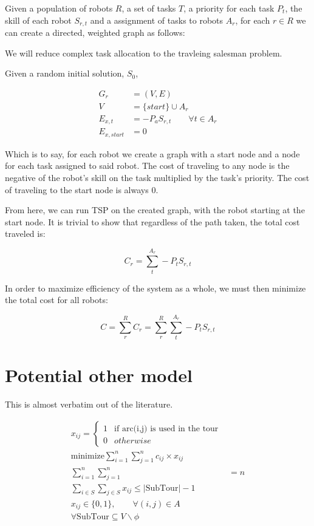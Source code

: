 \documentclass[a4paper]{article}
\begin{document}
Given a population of robots $R$, a set of tasks $T$, a priority for each task $P_t$, the
skill of each robot $S_{r,t}$ and a assignment of tasks to robots $A_r$, for each $r \in R$
we can create a directed, weighted graph as follows:

We will reduce complex task allocation to the travleing salesman problem.

Given a random initial solution, $S_0$,

\begin{align*}
  G_r &= (V, E) \\
  V &= \{ start \} \cup A_r \\
  E_{x, t} &= -P_a S_{r,t} \qquad \forall t \in A_r \\
  E_{x, start} &= 0
\end{align*}

Which is to say, for each robot we create a graph with a start node and a node for each task assigned to said robot. The cost of traveling to any node is the negative of the robot's skill on the task multiplied by the task's priority. The cost of traveling to the start node is always 0.

From here, we can run TSP on the created graph, with the robot starting at the start node. It is trivial to show that regardless of the path taken, the total cost traveled is:

$$C_r = \sum_t^{A_r} -P_t S_{r,t}$$

In order to maximize efficiency of the system as a whole, we must then minimize the total cost for all robots:

$$C = \sum_r^{R} C_r = \sum_r^{R} \sum_t^{A_r} -P_t S_{r,t}$$

\section{Potential other model}

This is almost verbatim out of the literature.

\begin{align}
x_{ij} = \begin{cases}
      1 & \text{if arc(i,j) is used in the tour} \\
      0 & otherwise
   \end{cases} \\
\text{minimize} \sum_{i=1}^n \sum_{j=1}^n c_{ij} \times x_{ij} \\
\sum_{i=1}^n \sum_{j=1}^n &= n \\
\sum_{i \in S} \sum_{j \in S} x_{ij} \le |\text{SubTour}| - 1 \\
x_{ij} \in \{0, 1\},\qquad \forall (i, j) \in A \\
\forall \text{SubTour} \subseteq V \backslash \phi
\end{align}
\end{document}
